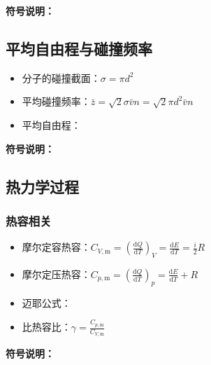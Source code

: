 \textbf{符号说明：}\\

\subsection{平均自由程与碰撞频率}
\begin{itemize}
    \item 分子的碰撞截面：$\sigma = \pi d^2$
    \item 平均碰撞频率：$\bar{z} = \sqrt{2} \sigma \bar{v} n = \sqrt{2} \pi d^2 \bar{v} n$
    \item 平均自由程：
\end{itemize}

\textbf{符号说明：}\\

\subsection{热力学过程}
\subsubsection{热容相关}
\begin{itemize}
    \item 摩尔定容热容：$C_{V,\text{m}} = \left( \frac{\mathrm{d}Q}{\mathrm{d}T} \right)_V = \frac{\mathrm{d}E}{\mathrm{d}T} = \frac{i}{2} R$
    \item 摩尔定压热容：$C_{p,\text{m}} = \left( \frac{\mathrm{d}Q}{\mathrm{d}T} \right)_p = \frac{\mathrm{d}E}{\mathrm{d}T} + R$
    \item 迈耶公式：
    \item 比热容比：$\gamma = \frac{C_{p,\text{m}}}{C_{V,\text{m}}}$
\end{itemize}

\textbf{符号说明：}\\

